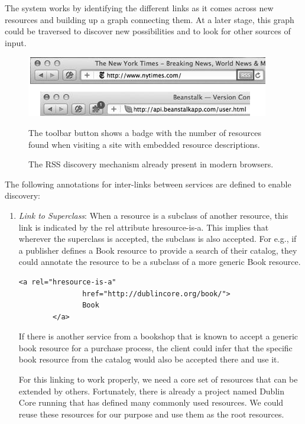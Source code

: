 \begin{spacing}{1.5}
\begin{enumerate}
The system works by identifying the different links as it comes across new resources and building up a graph connecting them. At a later stage, this graph could be traversed to discover new possibilities and to look for other sources of input.
\end{enumerate}

\begin{figure}
        \centering
        \includegraphics[scale=0.8]{images/rss_api.png}
        \caption{ The RSS discovery mechanism already present in modern browsers.}
        The toolbar button shows a badge with the number of resources found when visiting a site with embedded resource descriptions.
        \label{fig:rss_api}
\end{figure}

The following annotations for inter-links between services are defined to enable discovery:

\begin{enumerate}
\item {\it Link to Superclass}: When a resource is a subclass of another resource, this link is indicated by the rel attribute hresource-is-a. This implies that wherever the superclass is accepted, the subclass is also accepted. For e.g., if a publisher defines a Book resource to provide a search of their catalog, they could annotate the resource to be a subclass of a more generic Book resource.

\begin{verbatim}
<a rel="hresource-is-a"
               href="http://dublincore.org/book/">
               Book
        </a>
\end{verbatim}

If there is another service from a bookshop that is known to accept a generic book resource for a purchase process, the client could infer that the specific book resource from the catalog would also be accepted there and use it.

For this linking to work properly, we need a core set of resources that can be extended by others. Fortunately, there is already a project named Dublin Core running that has defined many commonly used resources. We could reuse these resources for our purpose and use them as the root resources.


\end{enumerate}
\end{spacing}
